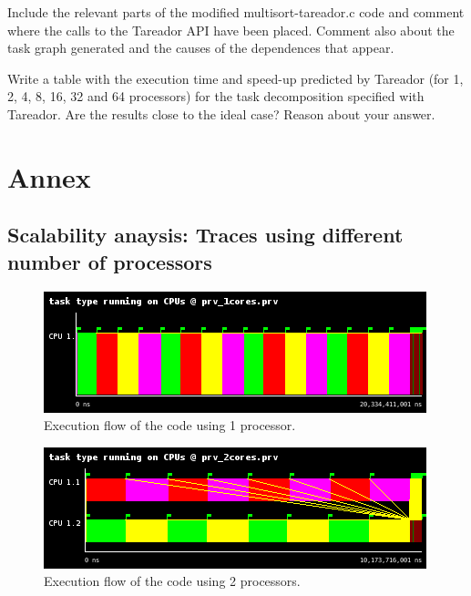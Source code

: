\documentclass[12pt, a4paper]{article}
\begin{document}
\break

Include the relevant parts of the modified multisort-tareador.c code and comment where the
calls to the Tareador API have been placed. Comment also about the task graph generated and
the causes of the dependences that appear.

Write a table with the execution time and speed-up predicted by Tareador (for 1, 2, 4, 8, 16, 32
and 64 processors) for the task decomposition specified with Tareador. Are the results close to the
ideal case? Reason about your answer.


\section{Annex}

\subsection{Scalability anaysis: Traces using different number of processors}

\begin{figure}[H]
	\centering
	\includegraphics[scale=0.75]{./images/S1_scalability/S1_scalability_1}
	
	\label{fig_ann:S1_scalability_1}
	\caption{Execution flow of the code using 1 processor.}
\end{figure}





\begin{figure}[H]
	\centering
	\includegraphics[scale=0.75]{./images/S1_scalability/S1_scalability_2}
	
	\label{fig_ann:S1_scalability_2}
	\caption{Execution flow of the code using 2 processors.}
\end{figure}
\end{document}
